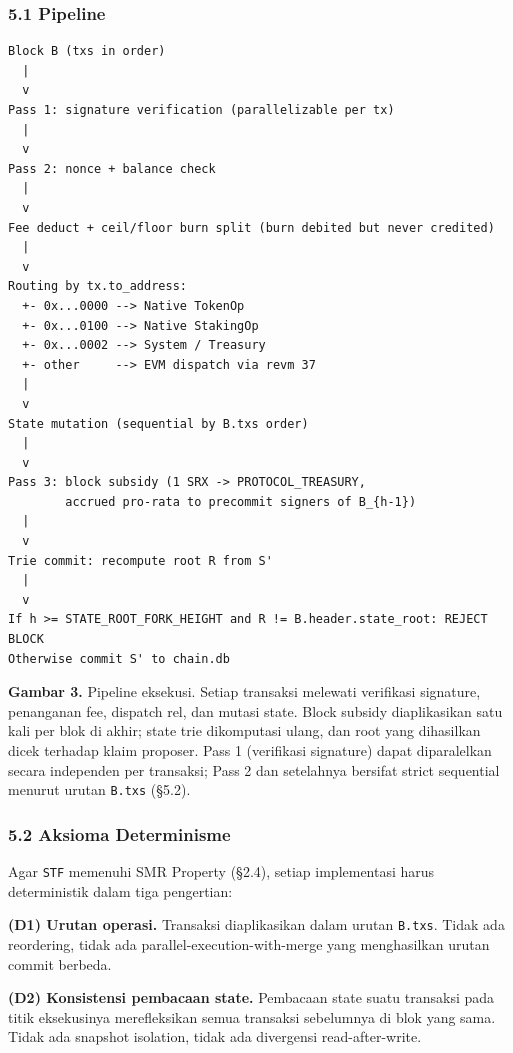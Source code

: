 \documentclass[11pt,a4paper]{article}
\newenvironment{Shaded}{}{}
\begin{document}
\hypertarget{pipeline}{%
\subsubsection{5.1 Pipeline}\label{pipeline}}


\begin{Shaded}
\begin{verbatim}
Block B (txs in order)
  |
  v
Pass 1: signature verification (parallelizable per tx)
  |
  v
Pass 2: nonce + balance check
  |
  v
Fee deduct + ceil/floor burn split (burn debited but never credited)
  |
  v
Routing by tx.to_address:
  +- 0x...0000 --> Native TokenOp
  +- 0x...0100 --> Native StakingOp
  +- 0x...0002 --> System / Treasury
  +- other     --> EVM dispatch via revm 37
  |
  v
State mutation (sequential by B.txs order)
  |
  v
Pass 3: block subsidy (1 SRX -> PROTOCOL_TREASURY,
        accrued pro-rata to precommit signers of B_{h-1})
  |
  v
Trie commit: recompute root R from S'
  |
  v
If h >= STATE_ROOT_FORK_HEIGHT and R != B.header.state_root: REJECT BLOCK
Otherwise commit S' to chain.db
\end{verbatim}
\end{Shaded}


\textbf{Gambar 3.} Pipeline eksekusi. Setiap transaksi melewati verifikasi signature, penanganan fee, dispatch rel, dan mutasi state. Block subsidy diaplikasikan satu kali per blok di akhir; state trie dikomputasi ulang, dan root yang dihasilkan dicek terhadap klaim proposer. Pass 1 (verifikasi signature) dapat diparalelkan secara independen per transaksi; Pass 2 dan setelahnya bersifat strict sequential menurut urutan \texttt{B.txs} (§5.2).

\hypertarget{aksioma-determinisme}{%
\subsubsection{5.2 Aksioma Determinisme}\label{aksioma-determinisme}}

Agar \texttt{STF} memenuhi SMR Property (§2.4), setiap implementasi harus deterministik dalam tiga pengertian:

\textbf{(D1) Urutan operasi.} Transaksi diaplikasikan dalam urutan \texttt{B.txs}. Tidak ada reordering, tidak ada parallel-execution-with-merge yang menghasilkan urutan commit berbeda.

\textbf{(D2) Konsistensi pembacaan state.} Pembacaan state suatu transaksi pada titik eksekusinya merefleksikan semua transaksi sebelumnya di blok yang sama. Tidak ada snapshot isolation, tidak ada divergensi read-after-write.
\end{document}

